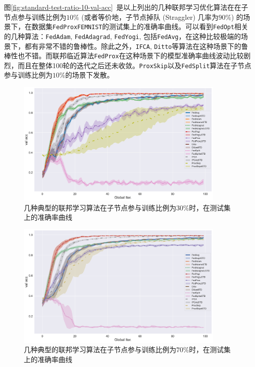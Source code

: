 图\ref{fig:standard-test-ratio-10-val-acc}~是以上列出的几种联邦学习优化算法在在子节点参与训练比例为$10\%$ (或者等价地，子节点掉队 (Straggler) 几率为$90\%$) 的场景下，在数据集\texttt{FedProxFEMNIST}的测试集上的准确率曲线。可以看到\texttt{FedOpt}相关的几种算法：\texttt{FedAdam}, \texttt{FedAdagrad}, \texttt{FedYogi}, 包括\texttt{FedAvg}，在这种比较极端的场景下，都有非常不错的鲁棒性。除此之外，\texttt{IFCA}, \texttt{Ditto}等算法在这种场景下的鲁棒性也不错。而联邦临近算法\texttt{FedProx}在这种场景下的模型准确率曲线波动比较剧烈，而且在整体100轮的迭代之后还未收敛。\texttt{ProxSkip}以及\texttt{FedSplit}算法在子节点参与训练比例为$10\%$的场景下发散。

\begin{figure}[ht]
    \centering
    \includegraphics[width=0.9\textwidth]{figures/standard-test-ratio-30-val-acc.pdf}
    \caption{几种典型的联邦学习算法在子节点参与训练比例为$30\%$时，在测试集上的准确率曲线}
    \label{fig:standard-test-ratio-30-val-acc}
\end{figure}

\begin{figure}[ht]
    \centering
    \includegraphics[width=0.9\textwidth]{figures/standard-test-ratio-70-val-acc.pdf}
    \caption{几种典型的联邦学习算法在子节点参与训练比例为$70\%$时，在测试集上的准确率曲线}
    \label{fig:standard-test-ratio-70-val-acc}
\end{figure}


